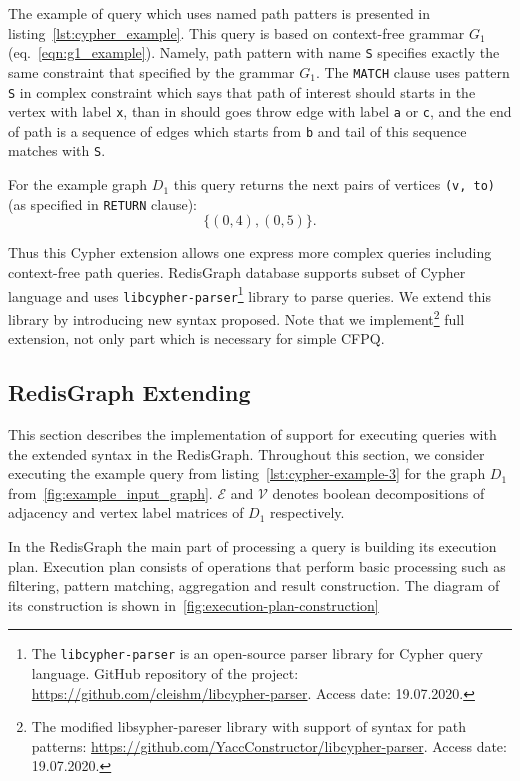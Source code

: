 The example of query which uses named path patters is presented in listing~\ref{lst:cypher_example}. 
This query is based on context-free grammar $G_1$ (eq.~\ref{eqn:g1_example}). 
Namely, path pattern with name \texttt{S} specifies exactly the same constraint that specified by the grammar $G_1$. 
The \texttt{MATCH} clause  uses pattern \texttt{S} in complex constraint which says that path of interest should starts in the vertex with label \texttt{x}, than in should goes throw edge with label \texttt{a} or \texttt{c}, and the end of path is a sequence of edges which starts from \texttt{b} and tail of this sequence matches with \texttt{S}.  

For the example graph $D_1$ this query returns the next pairs of vertices \texttt{(v, to)} (as specified in \texttt{RETURN} clause): 
$$\{(0, 4), (0, 5)\}.$$

Thus this Cypher extension allows one express more complex queries including context-free path queries.
RedisGraph database supports subset of Cypher language and uses \texttt{libcypher-parser}\footnote{The \texttt{libcypher-parser} is an open-source parser library for Cypher query language. GitHub repository of the project: \url{https://github.com/cleishm/libcypher-parser}. Access date: 19.07.2020.} library to parse queries.
We extend this library by introducing new syntax proposed.
Note that we implement\footnote{The modified libsypher-pareser library with support of syntax for path patterns: \url{https://github.com/YaccConstructor/libcypher-parser}. Access date: 19.07.2020.} full extension, not only part which is necessary for simple CFPQ. 

\subsection{RedisGraph Extending}

This section describes the implementation of support for executing queries with the extended syntax in the RedisGraph. Throughout this section, we consider executing the example query from listing~\autoref{lst:cypher-example-3} for the graph $D_1$ from~\autoref{fig:example_input_graph}. $\mathcal{E}$ and $\mathcal{V}$ denotes boolean decompositions of adjacency and vertex label matrices of $D_1$ respectively. 

In the RedisGraph the main part of processing a query is building its execution plan. Execution plan consists of operations that perform basic processing such as filtering, pattern matching, aggregation and result construction. The diagram of its construction is shown in~\autoref{fig:execution-plan-construction}


